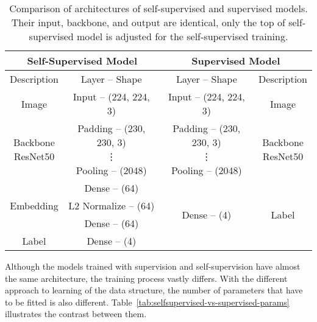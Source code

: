 \begin{table}[!ht]
    \begin{center}
        \begin{tabular}{ |c|c||c|c| }
            \hline
                \multicolumn{2}{|c||}{Self-Supervised Model} & \multicolumn{2}{c|}{Supervised Model} \\
            \hline
            \hline
            Description & Layer -- Shape & Layer -- Shape & Description \\
            \hline
            \hline
                Image & Input -- (224, 224, 3) & Input -- (224, 224, 3) & Image \\
            \hline
                \makecell{Backbone \\ ResNet50} & \makecell{Padding -- (230, 230, 3) \\ \vdots \\ Pooling -- (2048)} & \makecell{Padding -- (230, 230, 3) \\ \vdots \\ Pooling -- (2048)} & \makecell{Backbone \\ ResNet50} \\
            \hline
                & Dense -- (64) & \multirow{4}{*}{Dense -- (4)} & \multirow{4}{*}{Label} \\
            \cline{1-2}
                Embedding & L2 Normalize -- (64) & & \\
            \cline{1-2}
                & Dense -- (64) & & \\
            \cline{1-2}
                Label & Dense -- (4) & & \\
            \hline
        \end{tabular}
    \end{center}
    \caption{Comparison of architectures of self-supervised and supervised models. Their input, backbone, and output are identical, only the top of self-supervised model is adjusted for the self-supervised training.}
    \label{tab:self-supervised-vs-supervised}
\end{table}

Although the models trained with supervision and self-supervision have almost the same architecture, the training process vastly differs. With the different approach to learning of the data structure, the number of parameters that have to be fitted is also different. Table~\ref{tab:selfsupervised-vs-supervised-params} illustrates the contrast between them.

